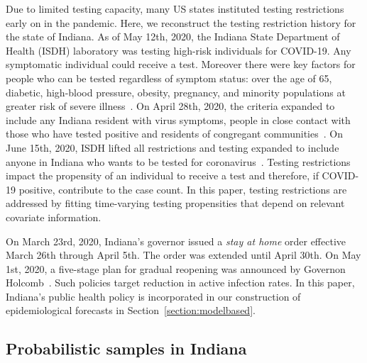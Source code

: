 \documentclass[11pt]{amsart}
\numberwithin{equation}{section}
\theoremstyle{plain}
\begin{document}
 Due to limited testing capacity, many US states instituted testing restrictions early on in the pandemic.
 Here, we reconstruct the testing restriction history for the state of Indiana. As of May 12th, 2020, the Indiana State Department of Health (ISDH) laboratory was testing high-risk individuals for COVID-19. Any symptomatic individual could receive a test.  Moreover there were key factors for people who can be tested regardless of symptom status: over the age of 65, diabetic, high-blood pressure, obesity, pregnancy, and minority populations at greater risk of severe illness~\citep{indystar2020}.
 On April 28th, 2020, the criteria expanded to include any Indiana resident with virus symptoms, people in close contact with those who have tested positive and residents of congregant communities~\citep{wishtv2020}.
 On June 15th, 2020, ISDH lifted all restrictions and testing expanded to include anyone in Indiana who wants to be tested for coronavirus~\citep{indystar2020v2}.
 Testing restrictions impact the propensity of an individual to receive a test and therefore, if COVID-19 positive, contribute to the case count.  In this paper, testing restrictions are addressed by fitting time-varying testing propensities that depend on relevant covariate information.

 On March 23rd, 2020, Indiana's governor issued a \emph{stay at home} order effective March 26th through April 5th.  The order was extended until April 30th. On May 1st, 2020, a five-stage plan for gradual reopening was announced by Governon Holcomb~\citep{fivestageplan}.  Such policies target reduction in active infection rates. In this paper, Indiana's public health policy is incorporated in our construction of epidemiological forecasts in Section~\ref{section:modelbased}.


 \subsection{Probabilistic samples in Indiana}
\end{document}
